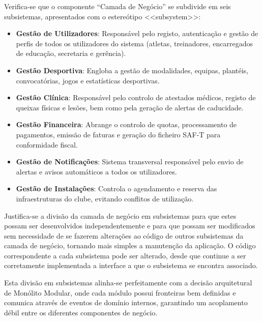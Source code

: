 Verifica-se que o componente ``Camada de Negócio'' se subdivide em seis subsistemas, apresentados com o estereótipo <<subsystem>>:

\begin{itemize}
    \item \textbf{Gestão de Utilizadores}: Responsável pelo registo, autenticação e gestão de perfis de todos os utilizadores do sistema (atletas, treinadores, encarregados de educação, secretaria e gerência).
    
    \item \textbf{Gestão Desportiva}: Engloba a gestão de modalidades, equipas, plantéis, convocatórias, jogos e estatísticas desportivas.
    
    \item \textbf{Gestão Clínica}: Responsável pelo controlo de atestados médicos, registo de queixas físicas e lesões, bem como pela geração de alertas de caducidade.
    
    \item \textbf{Gestão Financeira}: Abrange o controlo de quotas, processamento de pagamentos, emissão de faturas e geração do ficheiro SAF-T para conformidade fiscal.
    
    \item \textbf{Gestão de Notificações}: Sistema transversal responsável pelo envio de alertas e avisos automáticos a todos os utilizadores.
    
    \item \textbf{Gestão de Instalações}: Controla o agendamento e reserva das infraestruturas do clube, evitando conflitos de utilização.
\end{itemize}

Justifica-se a divisão da camada de negócio em subsistemas para que estes possam ser desenvolvidos independentemente e para que possam ser modificados sem necessidade de se fazerem alterações ao código de outros subsistemas da camada de negócio, tornando mais simples a manutenção da aplicação. O código correspondente a cada subsistema pode ser alterado, desde que continue a ser corretamente implementada a interface a que o subsistema se encontra associado.

Esta divisão em subsistemas alinha-se perfeitamente com a decisão arquitetural de Monólito Modular, onde cada módulo possui fronteiras bem definidas e comunica através de eventos de domínio internos, garantindo um acoplamento débil entre os diferentes componentes de negócio.
